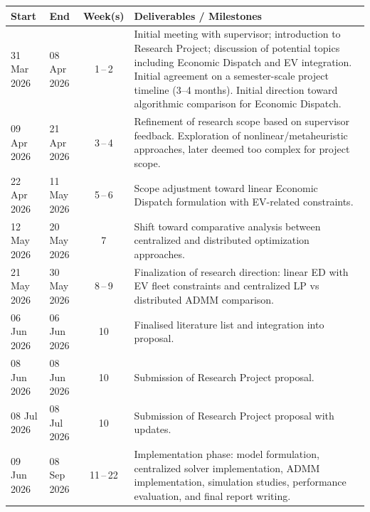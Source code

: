 \documentclass[12pt, a4paper]{article}
\begin{document}
\begin{center}
\begin{tabular}{@{} l l c p{5.5cm} @{}}
  \toprule
  \textbf{Start} & \textbf{End} & \textbf{Week(s)} & \textbf{Deliverables / Milestones} \\
  \midrule
  31 Mar 2026 & 08 Apr 2026 & 1\,--\,2 & Initial meeting with supervisor; introduction to Research Project; discussion of potential topics including Economic Dispatch and EV integration. Initial agreement on a semester-scale project timeline (3--4 months). Initial direction toward algorithmic comparison for Economic Dispatch. \\

  09 Apr 2026 & 21 Apr 2026 & 3\,--\,4 & Refinement of research scope based on supervisor feedback. Exploration of nonlinear/metaheuristic approaches, later deemed too complex for project scope. \\

  22 Apr 2026 & 11 May 2026 & 5\,--\,6 & Scope adjustment toward linear Economic Dispatch formulation with EV-related constraints. \\

  12 May 2026 & 20 May 2026 & 7 & Shift toward comparative analysis between centralized and distributed optimization approaches. \\

  21 May 2026 & 30 May 2026 & 8\,--\,9 & Finalization of research direction: linear ED with EV fleet constraints and centralized LP vs distributed ADMM comparison. \\

  06 Jun 2026 & 06 Jun 2026 & 10 & Finalised literature list and integration into proposal. \\

  08 Jun 2026 & 08 Jun 2026 & 10 & Submission of Research Project proposal. \\

  08 Jul 2026 & 08 Jul 2026 & 10 & Submission of Research Project proposal with updates. \\

  09 Jun 2026 & 08 Sep 2026 & 11\,--\,22 & Implementation phase: model formulation, centralized solver implementation, ADMM implementation, simulation studies, performance evaluation, and final report writing. \\

  \bottomrule
\end{tabular}
\end{center}


\clearpage
\nocite{Sortomme2012}
\printbibliography[heading=bibintoc]
\end{document}
